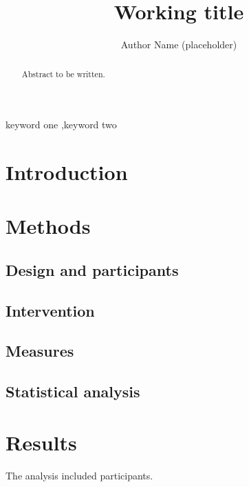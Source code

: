 \documentclass[preprint,12pt]{elsarticle}
\begin{document}
\begin{frontmatter}

\title{Working title}

\author{Author Name (placeholder)}
\address{Affiliation (placeholder)}

\begin{abstract}
Abstract to be written.
\end{abstract}

\begin{keyword}
keyword one \sep keyword two
\end{keyword}
\end{frontmatter}

\section{Introduction}

\section{Methods}
\subsection{Design and participants}
\subsection{Intervention}
\subsection{Measures}
\subsection{Statistical analysis}

\section{Results}
The analysis included \NTotal{} participants.
\end{document}
